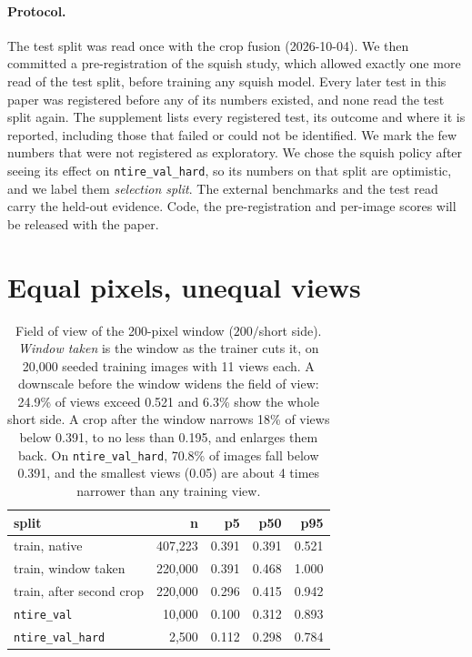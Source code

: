 \documentclass[letterpaper]{article} %
\begin{document}
\paragraph{Protocol.} The test split was read once with the crop fusion
(2026-10-04). We then committed a pre-registration of the squish study,
which allowed exactly one more read of the test split, before training any
squish model. Every later test in this paper was registered before any of
its numbers existed, and none read the test split again. The supplement
lists every registered test, its outcome and where it is reported, including
those that failed or could not be identified. We mark the few numbers that
were not registered as exploratory. We chose the squish policy
after seeing its effect on \texttt{ntire\_val\_hard}, so its numbers on that
split are optimistic, and we label them \emph{selection split}. The external benchmarks and the test read
carry the held-out evidence. Code, the pre-registration and per-image scores
will be released with the paper.

\section{Equal pixels, unequal views}
\label{sec:diagnosis}

\begin{table}[t]
\centering
\small
\begin{tabular}{lrrrr}
\toprule
split & n & p5 & p50 & p95 \\
\midrule
train, native & 407,223 & 0.391 & 0.391 & 0.521 \\
train, window taken & 220,000 & 0.391 & 0.468 & 1.000 \\
train, after second crop & 220,000 & 0.296 & 0.415 & 0.942 \\
\texttt{ntire\_val} & 10,000 & 0.100 & 0.312 & 0.893 \\
\texttt{ntire\_val\_hard} & 2,500 & 0.112 & 0.298 & 0.784 \\
\bottomrule
\end{tabular}
\caption{Field of view of the 200-pixel window ($200/$short side).
\emph{Window taken} is the window as the trainer cuts it, on 20,000 seeded
training images with 11 views each. A downscale before the window widens the
field of view: 24.9\% of views exceed 0.521 and 6.3\% show the whole short
side. A crop after the window narrows 18\% of views below 0.391, to no less
than 0.195, and enlarges them back. On \texttt{ntire\_val\_hard}, 70.8\% of
images fall below 0.391, and the smallest views (0.05) are about 4 times
narrower than any training view.}
\label{tab:fov}
\end{table}
\end{document}
